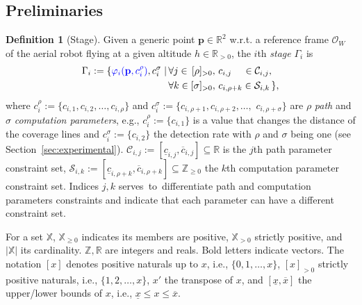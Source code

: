 \documentclass[letterpaper,10pt,journal,twoside]{IEEEtran}
\theoremstyle{definition}
\newtheorem{defn}{Definition}[section]
\begin{document}
\vspace*{-2ex}
\subsection{Preliminaries}
\label{sec:prelim}


\begin{defn}[Stage]\label{def:stage}
  Given a generic point $\mathbf{p}\in\mathbb{R}^2$ w.r.t. a reference frame $\mathcal{O}_W$ of the aerial robot flying at a given altitude $h\in\mathbb{R}_{>0}$, the $i$th \emph{stage} $\Gamma_i$ %
  is
  \begin{equation*}\begin{split}
    \Gamma_i:=\{{\color{blue}\varphi_i(\mathbf{p}%
    ,c_i^\rho)},c_i^\sigma\mid
    \,&\forall j\in\,[\rho]_{>0},\,c_{i,j}\,\,\,\,\,\,\,\in\mathcal{C}_{i,j},\,\\
      &\forall k\in[\sigma]_{>0},\,c_{i,\rho+k}\in\mathcal{S}_{i,k}\,\},
  \end{split}\end{equation*}
  where $c_i^\rho${\color{blue}$:=\{c_{i,1},c_{i,2},\dots,c_{i,\rho}\}$} and $c_i^\sigma${\color{blue}$:=\{c_{i,\rho+1},c_{i,\rho+2},\dots,$ $c_{i,\rho+\sigma}\}$} are $\rho$ \emph{path} and $\sigma$ \emph{computation parameters}{\color{blue}, e.g., $c_i^\rho:=\{c_{i,1}\}$ is a value that changes the distance of the coverage lines and $c^\sigma_i:=\{c_{i,2}\}$ the detection rate with $\rho$ and $\sigma$ being one (see Section~\ref{sec:experimental})}. $\mathcal{C}_{i,j}:=[\underline{c}_{i,j},\overline{c}_{i,j}]\subseteq\mathbb{R}$ is the $j$th path parameter %
  constraint set, %
  $\mathcal{S}_{i,k}:=[\underline{c}_{i,\rho+k},\overline{c}_{i,\rho+k}]\subseteq\mathbb{Z}_{\geq 0}$ %
  the $k$th computation parameter constraint set. {\color{blue}Indices $j,k$ serves~to~differentiate path and computation parameters constraints and indicate that each parameter can have a different constraint set.} 
\end{defn}


For a set $\mathbb{X}$, $\mathbb{X}_{\geq 0}$ indicates its members are positive, $\mathbb{X}_{> 0}$ strictly positive, and $|\mathbb{X}|$ its cardinality. $\mathbb{Z},\mathbb{R}$ are %
integers and reals. %
Bold letters indicate vectors. 
The notation $[x]$ denotes positive naturals up to $x$, i.e., $\{0,1,\dots,x\}$, {\color{blue}$[x]_{>0}$ strictly positive naturals, i.e., $\{1,2,\dots,x\}$,} $x'$ the transpose of $x$, and $[\underline{x},\overline{x}]$ the upper/lower bounds of %
$x$, i.e.,
  $\underline{x}\leq x\leq\overline{x}$.
\end{document}
